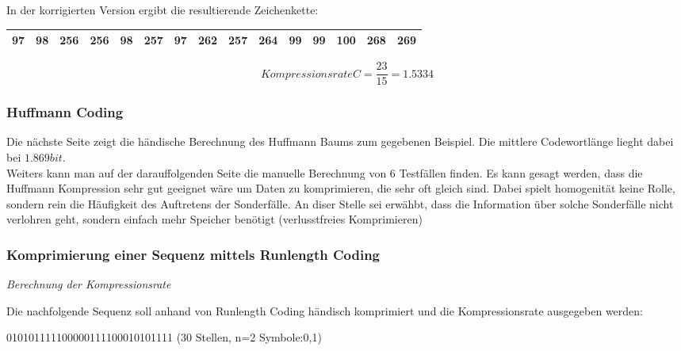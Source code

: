 \documentclass[12pt,german]{article}
\begin{document}
In der korrigierten Version ergibt die resultierende Zeichenkette: 

\begin{table}[H]
  \centering
  \begin{tabular}{| c | c | c | c | c | c | c | c | c | c | c | c | c | c | c |}
    \hline
    97 & 98& 256 & 256 & 98 & 257 & 97 & 262 & 257 & 264 & 99 & 99 & 100 & 268 & 269 \\
    \hline
  \end{tabular}
\end{table}


\begin{equation}[H]
 Kompressionsrate C = \frac{23}{15} = 1.5334	
\end{equation}


\subsubsection{Huffmann Coding}

Die nächste Seite zeigt die händische Berechnung des Huffmann Baums zum gegebenen Beispiel. Die mittlere Codewortlänge lieght dabei bei $1.869 bit $. \\

Weiters kann man auf der darauffolgenden Seite die manuelle Berechnung von 6 Testfällen finden. Es kann gesagt werden, dass die Huffmann Kompression sehr gut geeignet wäre um Daten zu komprimieren, die sehr oft gleich sind. Dabei spielt homogenität keine Rolle, sondern rein die Häufigkeit des Auftretens der Sonderfälle. An diser Stelle sei erwähbt, dass die Information über solche Sonderfälle nicht verlohren geht, sondern einfach mehr Speicher benötigt (verlusstfreies Komprimieren)


\label{fig:huffmannCalculation}


\label{fig:huffmannCalculation}


\subsubsection{Komprimierung einer Sequenz mittels Runlength Coding}
\textit{Berechnung der Kompressionsrate} 

Die nachfolgende Sequenz soll anhand von Runlength Coding händisch komprimiert und die Kompressionsrate ausgegeben werden:

010101111100000111100010101111 (30 Stellen, n=2 Symbole:0,1) \\
\end{document}
